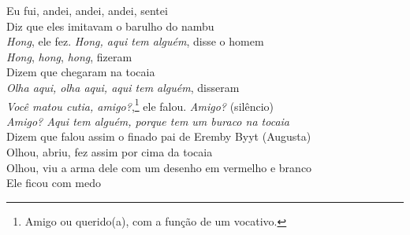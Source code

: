 \bigskip

\begin{linenumbers}\begingroup\raggedright
 
\noindent   Eu fui, andei, andei, andei, sentei\\
  Diz que eles imitavam o barulho do nambu\\
  \emph{Hong}, ele fez. \emph{Hong, aqui tem alguém}, disse o homem\\
  \emph{Hong}, \emph{hong}, \emph{hong}, fizeram\\
  Dizem que chegaram na tocaia\\
  \emph{Olha aqui, olha aqui, aqui tem alguém}, disseram\\
  \emph{Você matou cutia, amigo?},\footnote{Amigo ou querido(a), com a função de um vocativo.} ele falou. \emph{Amigo?} (silêncio)\\
  \emph{Amigo? Aqui tem alguém, porque tem um buraco na tocaia}\\
  Dizem que falou assim o finado pai de Eremby Byyt (Augusta)\\
  Olhou, abriu, fez assim por cima da tocaia\\
  Olhou, viu a arma dele com um desenho em vermelho e branco\\
  Ele ficou com medo
 
\end{linenumbers}\endgroup

\bigskip

